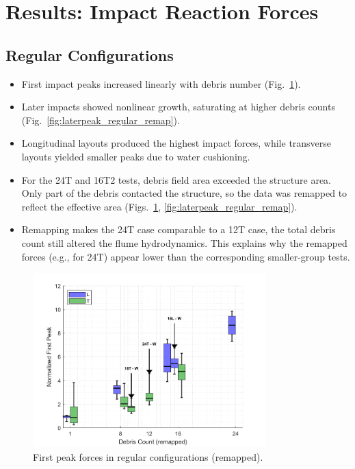 \documentclass{article}
\begin{document}
\section{Results: Impact Reaction Forces}

\subsection{Regular Configurations}
\begin{itemize}
    \item First impact peaks increased linearly with debris number (Fig.~\ref{fig:firstpeak_regular_remap}).
    \item Later impacts showed nonlinear growth, saturating at higher debris counts (Fig.~\ref{fig:laterpeak_regular_remap}).
    \item Longitudinal layouts produced the highest impact forces, while transverse layouts yielded smaller peaks due to water cushioning.
    \item For the 24T and 16T2 tests, debris field area exceeded the structure area. Only part of the debris contacted the structure, so the data was remapped to reflect the effective area (Figs.~\ref{fig:firstpeak_regular_remap}, \ref{fig:laterpeak_regular_remap}).
    \item Remapping makes the 24T case comparable to a 12T case, the total debris count still altered the flume hydrodynamics. This explains why the remapped forces (e.g., for 24T) appear lower than the corresponding smaller-group tests.

\end{itemize}

\begin{figure}[htbp]
    \centering
    \includegraphics[width=0.8\textwidth]{FirstPeak_Regular_RemappedT.png}
    \caption{First peak forces in regular configurations (remapped).}
    \label{fig:firstpeak_regular_remap}
\end{figure}
\end{document}
